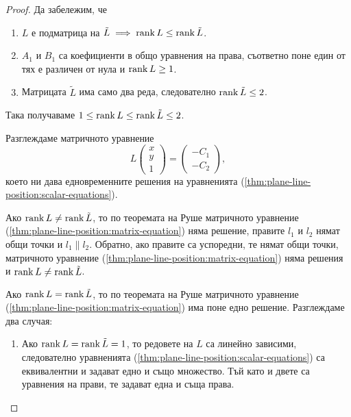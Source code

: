 \documentclass[numbers=endperiod, DIV=15, bibliography=totocnumbered]{scrartcl}
\begin{document}
\begin{proof}
  Да забележим, че
  \begin{enumerate}
    \item $L$ е подматрица на $\tilde L \implies \operatorname{rank} L \leq \operatorname{rank} \tilde L$.
    \item $A_1$ и $B_1$ са коефициенти в общо уравнения на права, съответно поне един от тях е различен от нула и $\operatorname{rank} L \geq 1$.
    \item Матрицата $\tilde L$ има само два реда, следователно $\operatorname{rank} \tilde L \leq 2$.
  \end{enumerate}

  Така получаваме $1 \leq \operatorname{rank} L \leq \operatorname{rank} \tilde L \leq 2$.

  Разглеждаме матричното уравнение
  \begin{equation}\label{thm:plane-line-position:matrix-equation}
    L
    \begin{pmatrix}
      x \\ y \\ 1
    \end{pmatrix}
    =
    \begin{pmatrix}
      -C_1 \\ -C_2
    \end{pmatrix},
  \end{equation}
  което ни дава едновременните решения на уравненията (\ref{thm:plane-line-position:scalar-equations}).

  Ако $\operatorname{rank} L \neq \operatorname{rank} \tilde L$, то по теоремата на Руше матричното уравнение (\ref{thm:plane-line-position:matrix-equation}) няма решение, правите $l_1$ и $l_2$ нямат общи точки и $l_1 \parallel l_2$. Обратно, ако правите са успоредни, те нямат общи точки, матричното уравнение (\ref{thm:plane-line-position:matrix-equation}) няма решения и $\operatorname{rank} L \neq \operatorname{rank} \tilde L$.

  Ако $\operatorname{rank} L = \operatorname{rank} \tilde L$, то по теоремата на Руше матричното уравнение (\ref{thm:plane-line-position:matrix-equation}) има поне едно решение. Разглеждаме два случая:
  \begin{enumerate}
    \item Ако $\operatorname{rank} L = \operatorname{rank} \tilde L = 1$, то редовете на $L$ са линейно зависими, следователно уравненията (\ref{thm:plane-line-position:scalar-equations}) са еквивалентни и задават едно и също множество. Тъй като и двете са уравнения на прави, те задават една и съща права.


\end{enumerate}
\end{proof}
\end{document}
